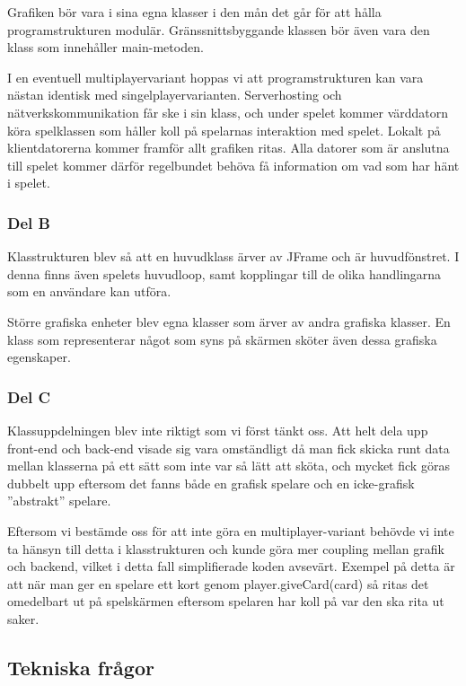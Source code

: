 \documentclass[10pt,a4paper]{article}
\begin{document}
Grafiken bör vara i sina egna klasser i den mån det går för att hålla
programstrukturen modulär. Gränssnittsbyggande klassen bör även vara den
klass som innehåller main-metoden.

I en eventuell multiplayervariant hoppas vi att programstrukturen kan vara
nästan identisk med singelplayervarianten. Serverhosting och
nätverkskommunikation får ske i sin klass, och under spelet kommer
värddatorn köra spelklassen som håller koll på spelarnas interaktion med
spelet. Lokalt på klientdatorerna kommer framför allt grafiken ritas. Alla
datorer som är anslutna till spelet kommer därför regelbundet behöva få
information om vad som har hänt i spelet.

\subsubsection*{Del B}

Klasstrukturen blev så att en huvudklass ärver av JFrame och är
huvudfönstret. I denna finns även spelets huvudloop, samt kopplingar till
de olika handlingarna som en användare kan utföra.

Större grafiska enheter blev egna klasser som ärver av andra grafiska
klasser. En klass som representerar något som syns på skärmen sköter även
dessa grafiska egenskaper.

\subsubsection*{Del C}

Klassuppdelningen blev inte riktigt som vi först tänkt oss. Att helt dela
upp front-end och back-end visade sig vara omständligt då man fick skicka
runt data mellan klasserna på ett sätt som inte var så lätt att sköta, och
mycket fick göras dubbelt upp eftersom det fanns både en grafisk spelare
och en icke-grafisk ''abstrakt'' spelare.

Eftersom vi bestämde oss för att inte göra en multiplayer-variant behövde
vi inte ta hänsyn till detta i klasstrukturen och kunde göra mer coupling
mellan grafik och backend, vilket i detta fall simplifierade koden
avsevärt. Exempel på detta är att när man ger en spelare ett kort genom
player.giveCard(card) så ritas det omedelbart ut på spelskärmen eftersom
spelaren har koll på var den ska rita ut saker.

\subsection*{Tekniska frågor}
\end{document}
